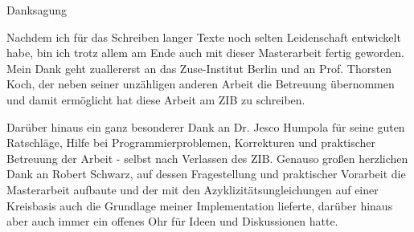\begin{huge}
Danksagung\\
 
\end{huge}


Nachdem ich für das Schreiben langer Texte noch selten Leidenschaft entwickelt habe, bin ich trotz allem am Ende auch 
mit dieser Masterarbeit fertig geworden. Mein Dank geht zuallererst an das Zuse-Institut Berlin und an Prof. Thorsten 
Koch, der neben seiner unzähligen anderen Arbeit die Betreuung übernommen und damit ermöglicht hat diese Arbeit am ZIB 
zu schreiben. 

Darüber hinaus ein ganz besonderer Dank an Dr. Jesco Humpola für seine guten Ratschläge, Hilfe bei 
Programmierproblemen, Korrekturen und praktischer Betreuung der Arbeit - selbst nach Verlassen des ZIB. Genauso großen 
herzlichen Dank an Robert Schwarz, auf dessen Fragestellung und praktischer Vorarbeit die Masterarbeit aufbaute und der 
mit den Azyklizitätsungleichungen auf einer Kreisbasis auch die Grundlage meiner Implementation lieferte, darüber 
hinaus aber auch immer ein offenes Ohr für Ideen und Diskussionen hatte.

